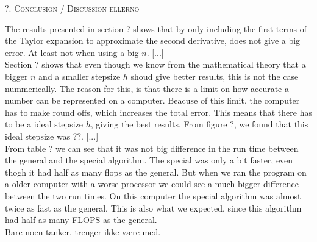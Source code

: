 \documentclass[a4paper,10pt,]{article}
\begin{document}
\begin{center}
\textsc{?. Conclusion / Discussion ellerno}
\end{center}
The results presented in section ? shows that by only including the first terms of the Taylor expansion to approximate the second derivative, does not give a big error. At least not when using a big $n$.  [...] \\

Section ? shows that even though we know from the mathematical theory that a bigger $n$ and a smaller stepsize $h$ shoud give better results, this is not the case nummerically. The reason for this, is that there is a limit on how accurate a number can be represented on a computer. Beacuse of this limit, the computer has to make round offs, which increases the total error. This means that there has to be a ideal stepsize $h$, giving the best results. From figure ?, we found that this ideal stepsize was ??. [...] \\

From table ? we can see that it was not big difference in the run time between the general and the special algorithm. The special was only a bit faster, even thogh it had half as many flops as the general. But when we ran the program on a older computer with a worse processor we could see a much bigger difference between the two run times. On this computer the special algorithm was almost twice as fast as the general. This is also what we expected, since this algorithm had half as many FLOPS as the general. \\

Bare noen tanker, trenger ikke være med.
\end{document}

